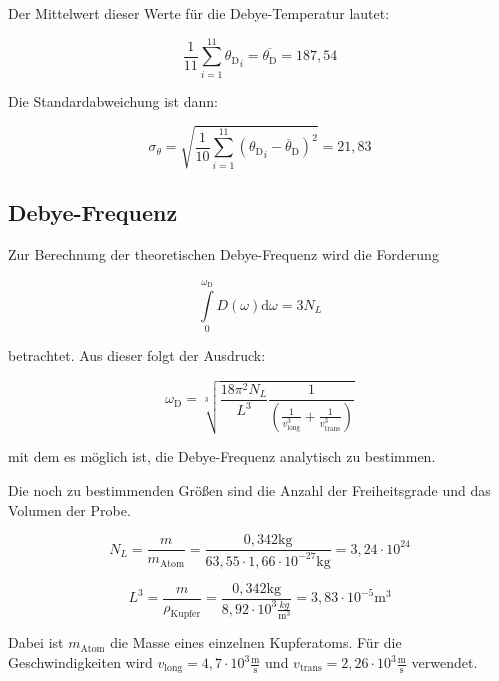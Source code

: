 \noindent Der Mittelwert dieser Werte für die Debye-Temperatur lautet:

\begin{equation}
\frac{1}{11}\sum\limits_{i=1}^{11}{\theta_{\text{D}}}_i=\overline{\theta_\text{D}}=187,54
\end{equation}

\noindent Die Standardabweichung ist dann:

\begin{equation}
\sigma_\theta=\sqrt{\frac{1}{10}\sum\limits_{i=1}^{11}({\theta_{\text{D}}}_i-\overline \theta_{\text{D}})^2}=21,83
\end{equation}

\subsection{Debye-Frequenz}
Zur Berechnung der theoretischen Debye-Frequenz wird die Forderung

\begin{equation}
\int\limits_0^{\omega_\text{D}}D(\omega)\text{d}\omega=3N_L
\end{equation}

betrachtet. Aus dieser folgt der Ausdruck:

\begin{equation}
\omega_\text{D}=\sqrt[3]{\frac{18\pi^2N_L}{L^3}\frac{1}{\left(\frac{1}{v_{\text{long}}^3}+\frac{1}{v_\text{trans}^3}\right)}}
\end{equation}

mit dem es möglich ist, die Debye-Frequenz analytisch zu bestimmen.

\noindent Die noch zu bestimmenden Größen sind die Anzahl der Freiheitsgrade und das Volumen der Probe.

\begin{equation*}
N_L=\frac{m}{m_\text{Atom}}=\frac{0,342\text{kg}}{63,55\cdot 1,66\cdot10^{-27}\text{kg}}=3,24\cdot10^{24}
\end{equation*}

\begin{equation*}
L^3=\frac{m}{\rho_\text{Kupfer}}=\frac{0,342\text{kg}}{8,92\cdot10^3\frac{kg}{\text{m}^3}}=3,83\cdot10^{-5}\text{m}^3
\end{equation*}

\noindent Dabei ist \(m_\text{Atom}\) die Masse eines einzelnen Kupferatoms. Für die Geschwindigkeiten wird \(v_\text{long}=4,7\cdot10^3\frac{\text{m}}{\text{s}}\) und \(v_\text{trans}=2,26\cdot10^3\frac{\text{m}}{\text{s}}\) verwendet.

